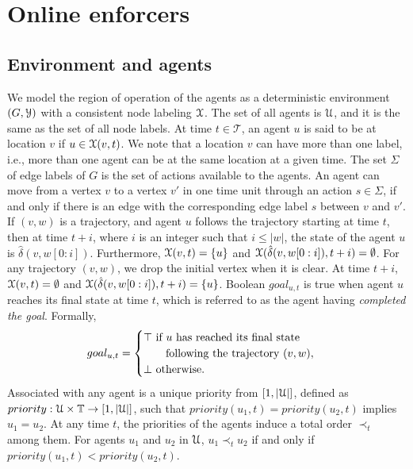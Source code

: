 \section{Online enforcers}
\label{sec:formulation}

\subsection{Environment and agents}
We model the region of operation of the agents as a deterministic environment $(G,\mathcal{Y})$ with a consistent node labeling $\mathcal{X}$. The set of all agents is $\mathcal{U}$, and it is the same as the set of all node labels. At time $t \in \mathcal{T}$, an agent $u$ is said to be at location $v$ if $u \in \mathcal{X}(v,t)$. We note that a location $v$ can have more than one label, i.e., more than one agent can be at the same location at a given time. The set $\Sigma$ of edge labels of $G$ is the set of actions available to the agents.
An agent can move from a vertex $v$ to a vertex $v'$ in one time unit through an action $s \in \Sigma$, if and only if there is an edge with the corresponding edge label $s$ between $v$ and $v'$. 
 If $(v,w)$ is a trajectory, and agent $u$ follows the trajectory starting at time $t$, then at time $t+i$, where $i$ is an integer such that $i \leq |w|$, the state of the agent $u$ is $\hat{\delta}(v,w[0:i])$. Furthermore, $\mathcal{X}(v,t) = \{u\}$ and $\mathcal{X}(\hat{\delta}(v,w[0:i]),t+i) = \emptyset$. 
For any trajectory $(v,w)$, we drop the initial vertex when it is clear.
At time $t+i$,  $\mathcal{X}(v,t) = \emptyset$ and $\mathcal{X}(\hat{\delta}(v,w[0:i]),t+i) = \{u\}$.  
Boolean $goal_{u,t}$ is true when agent $u$ reaches its final state at time $t$, which is referred to as the agent having \emph{completed the goal}.
Formally,
\begin{equation}
    goal_{u,t} = \begin{cases}
\top \text{ if } u \text{ has reached its final state} \\ \text{\qquad following the trajectory } (v,w),
\\
\bot \text{ otherwise.}
\end{cases}
\end{equation}
Associated with any agent is a unique priority from $[1,|\mathcal{U}|]$, defined as $priority: \mathcal{U} \times \mathbb{T} \to [1,|\mathcal{U}|]$, such that $priority(u_1,t) = priority(u_2,t)$ implies $u_1 = u_2$. At any time $t$, the priorities of the agents induce a total order $\prec_t$ among them. 
For agents $u_1$ and $u_2$ in $\mathcal{U}$, $u_1 \prec_t u_2$ if and only if $priority(u_1,t) < priority(u_2,t)$.

